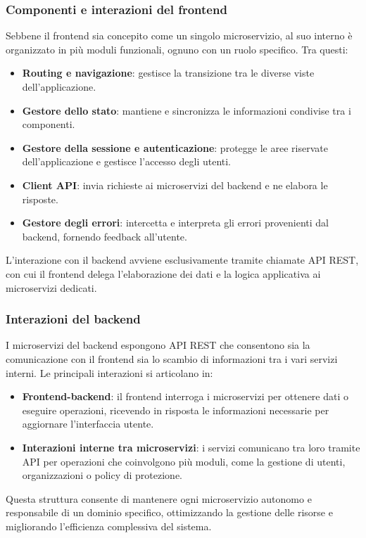 \subsubsection{Componenti e interazioni del frontend}
Sebbene il frontend sia concepito come un singolo microservizio, al suo interno è organizzato in più moduli funzionali, ognuno con un ruolo specifico. Tra questi:
\begin{itemize}
    \item \textbf{Routing e navigazione}: gestisce la transizione tra le diverse viste dell'applicazione.
    \item \textbf{Gestore dello stato}: mantiene e sincronizza le informazioni condivise tra i componenti.
    \item \textbf{Gestore della sessione e autenticazione}: protegge le aree riservate dell’applicazione e gestisce l’accesso degli utenti.
    \item \textbf{Client API}: invia richieste ai microservizi del backend e ne elabora le risposte.
    \item \textbf{Gestore degli errori}: intercetta e interpreta gli errori provenienti dal backend, fornendo feedback all’utente.
\end{itemize}

L’interazione con il backend avviene esclusivamente tramite chiamate API REST, con cui il frontend delega l’elaborazione dei dati e la logica applicativa ai microservizi dedicati.

\subsubsection{Interazioni del backend}
I microservizi del backend espongono API REST che consentono sia la comunicazione con il frontend sia lo scambio di informazioni tra i vari servizi interni. Le principali interazioni si articolano in:
\begin{itemize}
    \item \textbf{Frontend-backend}: il frontend interroga i microservizi per ottenere dati o eseguire operazioni, ricevendo in risposta le informazioni necessarie per aggiornare l'interfaccia utente.
    \item \textbf{Interazioni interne tra microservizi}: i servizi comunicano tra loro tramite API per operazioni che coinvolgono più moduli, come la gestione di utenti, organizzazioni o policy di protezione.
\end{itemize}

Questa struttura consente di mantenere ogni microservizio autonomo e responsabile di un dominio specifico, ottimizzando la gestione delle risorse e migliorando l'efficienza complessiva del sistema.

